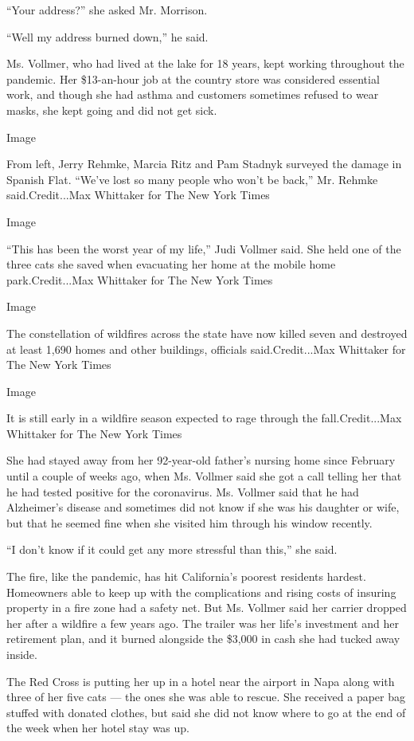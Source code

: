 ``Your address?'' she asked Mr. Morrison.

``Well my address burned down,'' he said.

Ms. Vollmer, who had lived at the lake for 18 years, kept working
throughout the pandemic. Her \$13-an-hour job at the country store was
considered essential work, and though she had asthma and customers
sometimes refused to wear masks, she kept going and did not get sick.

Image

From left, Jerry Rehmke, Marcia Ritz and Pam Stadnyk surveyed the damage
in Spanish Flat. ``We've lost so many people who won't be back,'' Mr.
Rehmke said.Credit...Max Whittaker for The New York Times

Image

``This has been the worst year of my life,'' Judi Vollmer said. She held
one of the three cats she saved when evacuating her home at the mobile
home park.Credit...Max Whittaker for The New York Times

Image

The constellation of wildfires across the state have now killed seven
and destroyed at least 1,690 homes and other buildings, officials
said.Credit...Max Whittaker for The New York Times

Image

It is still early in a wildfire season expected to rage through the
fall.Credit...Max Whittaker for The New York Times

She had stayed away from her 92-year-old father's nursing home since
February until a couple of weeks ago, when Ms. Vollmer said she got a
call telling her that he had tested positive for the coronavirus. Ms.
Vollmer said that he had Alzheimer's disease and sometimes did not know
if she was his daughter or wife, but that he seemed fine when she
visited him through his window recently.

``I don't know if it could get any more stressful than this,'' she said.

The fire, like the pandemic, has hit California's poorest residents
hardest. Homeowners able to keep up with the complications and rising
costs of insuring property in a fire zone had a safety net. But Ms.
Vollmer said her carrier dropped her after a wildfire a few years ago.
The trailer was her life's investment and her retirement plan, and it
burned alongside the \$3,000 in cash she had tucked away inside.

The Red Cross is putting her up in a hotel near the airport in Napa
along with three of her five cats --- the ones she was able to rescue.
She received a paper bag stuffed with donated clothes, but said she did
not know where to go at the end of the week when her hotel stay was up.

